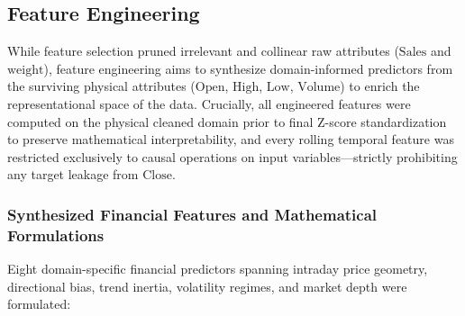 \documentclass[conference]{IEEEtran}
\begin{document}
\FloatBarrier
\subsection{Feature Engineering}
\label{sec:feature_engineering}

While feature selection pruned irrelevant and collinear raw attributes ($\text{Sales}$ and $\text{weight}$), feature engineering aims to synthesize domain-informed predictors from the surviving physical attributes ($\text{Open}$, $\text{High}$, $\text{Low}$, $\text{Volume}$) to enrich the representational space of the data. Crucially, all engineered features were computed on the physical cleaned domain prior to final Z-score standardization to preserve mathematical interpretability, and every rolling temporal feature was restricted exclusively to causal operations on input variables---strictly prohibiting any target leakage from $\text{Close}$.

\subsubsection{Synthesized Financial Features and Mathematical Formulations}
Eight domain-specific financial predictors spanning intraday price geometry, directional bias, trend inertia, volatility regimes, and market depth were formulated:
\end{document}
